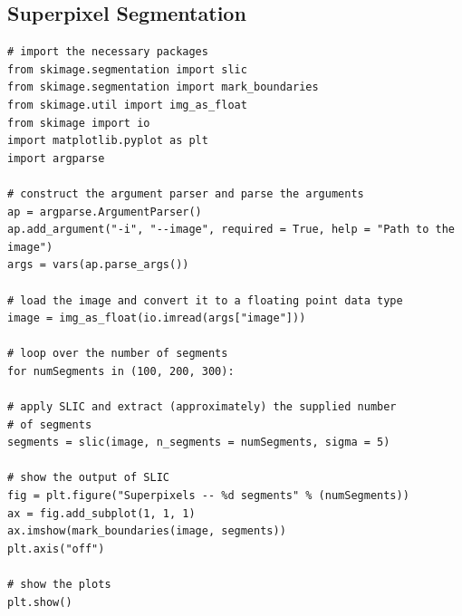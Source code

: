 \documentclass[x11names,11pt,a4paper]{article}
\theoremstyle{definition}
\begin{document}
\subsection{Superpixel Segmentation}
\begin{verbatim}
# import the necessary packages
from skimage.segmentation import slic
from skimage.segmentation import mark_boundaries
from skimage.util import img_as_float
from skimage import io
import matplotlib.pyplot as plt
import argparse

# construct the argument parser and parse the arguments
ap = argparse.ArgumentParser()
ap.add_argument("-i", "--image", required = True, help = "Path to the image")
args = vars(ap.parse_args())

# load the image and convert it to a floating point data type
image = img_as_float(io.imread(args["image"]))

# loop over the number of segments
for numSegments in (100, 200, 300):

# apply SLIC and extract (approximately) the supplied number
# of segments
segments = slic(image, n_segments = numSegments, sigma = 5)

# show the output of SLIC
fig = plt.figure("Superpixels -- %d segments" % (numSegments))
ax = fig.add_subplot(1, 1, 1)
ax.imshow(mark_boundaries(image, segments))
plt.axis("off")

# show the plots
plt.show()
\end{verbatim}
\end{document}

